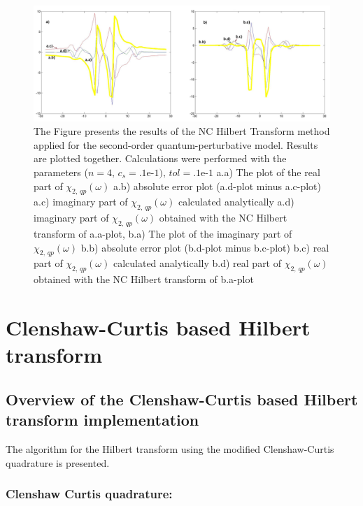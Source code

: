 \documentclass[12pt,twoside,a4paper]{article}
\numberwithin{equation}{subsection}
\numberwithin{figure}{subsection}
\begin{document}
\begin{figure} 
  \includegraphics[width=150mm]{img/nc_quantum2.png}
  \caption{The Figure presents the results of the NC Hilbert Transform method applied for the second-order quantum-perturbative model. Results are plotted together. Calculations were performed with the parameters ($n = 4, \, c_s = \mbox{.1e-1}), \,tol=\mbox{.1e-1}$ a.a) The plot of the real part of ${\chi_{2, \,qp}}(\omega )$
     a.b) absolute error plot (a.d-plot minus a.c-plot) 
     a.c) imaginary part of ${\chi_{2, \,qp}}(\omega )$ calculated analytically 
     a.d) imaginary part of ${\chi_{2, \,qp}}(\omega )$ obtained with the NC Hilbert transform of a.a-plot, 
     b.a) The plot of the imaginary part of ${\chi_{2, \,qp}}(\omega )$ 
     b.b) absolute error plot (b.d-plot minus b.c-plot) 
     b.c) real part of $\chi_{2, \, qp} (\omega )$ calculated analytically 
     b.d) real part of $\chi_{2, \, qp} (\omega )$ obtained with the NC Hilbert transform of b.a-plot 
     \label{fig:nc_quantum2}
     }
\end{figure}
 
\section{Clenshaw-Curtis based Hilbert transform} \label{chap:hcc}

\subsection{Overview of the Clenshaw-Curtis based Hilbert transform implementation} \label{chap:hcc_overview}

The algorithm for the Hilbert transform using the modified Clenshaw-Curtis quadrature is presented. 

\subsubsection*{Clenshaw Curtis quadrature: }
\end{document}
